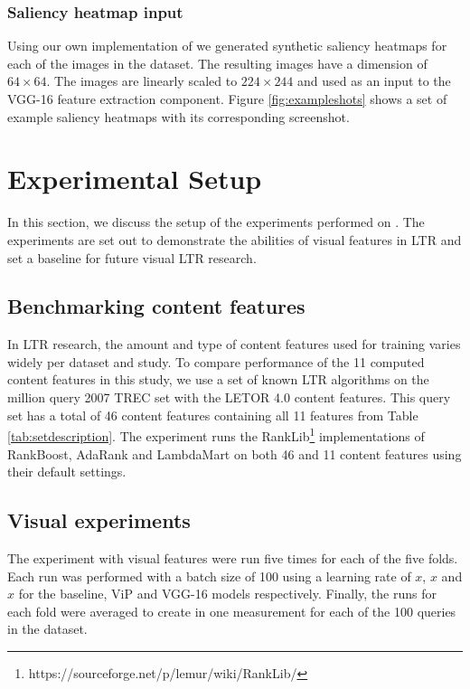 \subsubsection{Saliency heatmap input}
Using our own implementation of \citet{shan2017two} we generated synthetic saliency heatmaps for each of the images in the \datasetname dataset. The resulting images have a dimension of $64\times64$. The images are linearly scaled to $224\times244$ and used as an input to the VGG-16 feature extraction component. Figure \ref{fig:exampleshots} shows a set of example saliency heatmaps with its corresponding screenshot. 

\section{Experimental Setup}\label{sec:experiments}
In this section, we discuss the setup of the experiments performed on \datasetname. The experiments are set out to demonstrate the abilities of visual features in LTR and set a baseline for future visual LTR research.


\subsection{Benchmarking content features}
In LTR research, the amount and type of content features used for training varies widely per dataset and study. To compare performance of the 11 computed content features in this study, we use a set of known LTR algorithms on the million query 2007 TREC set with the LETOR 4.0 content features. This query set has a total of 46 content features containing all 11 features from Table \ref{tab:setdescription}. The experiment runs the RankLib\footnote{https://sourceforge.net/p/lemur/wiki/RankLib/} implementations of RankBoost, AdaRank and LambdaMart on both 46 and 11 content features using their default settings. 

\subsection{Visual experiments}
The experiment with visual features were run five times for each of the five folds. Each run was performed with a batch size of 100 using a learning rate of $x$, $x$ and $x$ for the baseline, ViP and VGG-16 models respectively. Finally, the runs for each fold were averaged to create in one measurement for each of the 100 queries in the dataset. 

